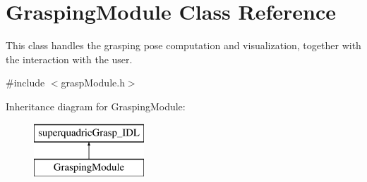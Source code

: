 \section{Grasping\+Module Class Reference}
\label{classGraspingModule}


This class handles the grasping pose computation and visualization, together with the interaction with the user.  




{\ttfamily \#include $<$grasp\+Module.\+h$>$}

Inheritance diagram for Grasping\+Module\+:\begin{figure}[H]
\begin{center}
\leavevmode
\includegraphics[height=2.000000cm]{classGraspingModule}
\end{center}
\end{figure}
